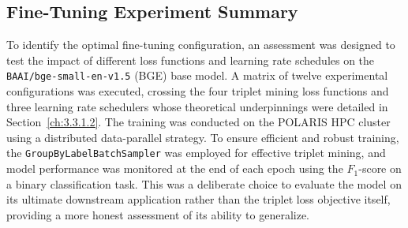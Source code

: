 \subsection{Fine-Tuning Experiment Summary}\label{ch:4.4.1}
To identify the optimal fine-tuning configuration, an assessment was designed to test the impact of different loss functions and learning rate schedules on the \verb|BAAI/bge-small-en-v1.5| (BGE) base model. A matrix of twelve experimental configurations was executed, crossing the four triplet mining loss functions and three learning rate schedulers whose theoretical underpinnings were detailed in Section~\ref{ch:3.3.1.2}. The training was conducted on the POLARIS HPC cluster using a distributed data-parallel strategy. To ensure efficient and robust training, the \verb|GroupByLabelBatchSampler| was employed for effective triplet mining, and model performance was monitored at the end of each epoch using the \(F_1\)-score on a binary classification task. This was a deliberate choice to evaluate the model on its ultimate downstream application rather than the triplet loss objective itself, providing a more honest assessment of its ability to generalize.{\setlength{\emergencystretch}{5em}\par}

